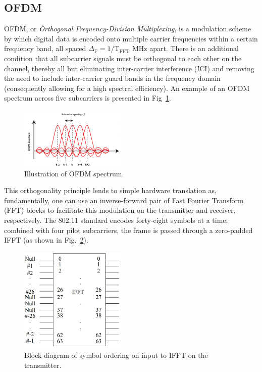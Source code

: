 \documentclass[journal]{IEEEtran}
\begin{document}
\subsection{OFDM} \label{sec:OFDM}
OFDM, or \emph{Orthogonal Frequency-Division Multiplexing}, is a modulation scheme by which digital data is encoded onto multiple carrier frequencies within a certain frequency band, all spaced $\Delta_\text{F} = 1/\text{T}_\text{FFT}$ MHz apart. There is an additional condition that all subcarrier signals must be orthogonal to each other on the channel, thereby all but eliminating inter-carrier interference (ICI) and removing the need to include inter-carrier guard bands in the frequency domain (consequently allowing for a high spectral efficiency). An example of an OFDM spectrum across five subcarriers is presented in Fig~\ref{fig:OFDM}.
\begin{figure}
    \centering
    \includegraphics[width = 0.45\textwidth]{OFDM}
    \caption{Illustration of OFDM spectrum.}
    \label{fig:OFDM}
\end{figure}

This orthogonality principle lends to simple hardware translation as, fundamentally, one can use an inverse-forward pair of Fast Fourier Transform (FFT) blocks to facilitate this modulation on the transmitter and receiver, respectively. The 802.11 standard encodes forty-eight symbols at a time; combined with four pilot subcarriers, the frame is passed through a zero-padded IFFT (as shown in Fig.~\ref{fig:IFFT}).
\begin{figure}
    \centering
    \includegraphics[width = 0.45\textwidth]{IFFT}
    \caption{Block diagram of symbol ordering on input to IFFT on the transmitter.}
    \label{fig:IFFT}
\end{figure}
\end{document}
